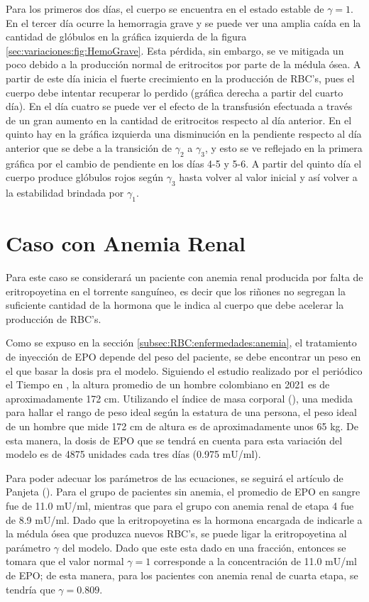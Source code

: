 Para los primeros dos días, el cuerpo se encuentra en el estado estable de $\gamma = 1$. En el tercer día ocurre la hemorragia grave y se puede ver una amplia caída en la cantidad de glóbulos en la gráfica izquierda de la figura \ref{sec:variaciones:fig:HemoGrave}. Esta pérdida, sin embargo, se ve mitigada un poco debido a la producción normal de eritrocitos por parte de la médula ósea. A partir de este día inicia el fuerte crecimiento en la producción de RBC's, pues el cuerpo debe intentar recuperar lo perdido (gráfica derecha a partir del cuarto día). En el día cuatro se puede ver el efecto de la transfusión efectuada a través de un gran aumento en la cantidad de eritrocitos respecto al día anterior. En el quinto hay en la gráfica izquierda una disminución en la pendiente respecto al día anterior que se debe a la transición de $\gamma_2$ a $\gamma_3$, y esto se ve reflejado en la primera gráfica por el cambio de pendiente en los días 4-5 y 5-6. A partir del quinto día el cuerpo produce glóbulos rojos según $\gamma_3$ hasta volver al valor inicial y así volver a la estabilidad brindada por $\gamma_1$.

\section{Caso con Anemia Renal}\label{Sec:variaciones:anemia}

Para este caso se considerará un paciente con anemia renal producida por falta de eritropoyetina en el torrente sanguíneo, es decir que los riñones no segregan la suficiente cantidad de la hormona que le indica al cuerpo que debe acelerar la producción de RBC's.

Como se expuso en la sección \ref{subsec:RBC:enfermedades:anemia}, el tratamiento de inyección de EPO depende del peso del paciente, se debe encontrar un peso en el que basar la dosis pra el modelo. Siguiendo el estudio realizado por el periódico el Tiempo en \cite{elTiempo}, la altura promedio de un hombre colombiano en 2021 es de aproximadamente 172 cm. Utilizando el índice de masa corporal (\cite{IMC}), una medida para hallar el rango de peso ideal según la estatura de una persona, el peso ideal de un hombre que mide 172 cm de altura es de aproximadamente unos 65 kg. De esta manera, la dosis de EPO que se tendrá en cuenta para esta variación del modelo es de 4875 unidades cada tres días (0.975 mU/ml).

Para poder adecuar los parámetros de las ecuaciones, se seguirá el artículo de Panjeta (\cite{panjeta2017interpretation}). Para el grupo de pacientes sin anemia, el promedio de EPO en sangre fue de 11.0 mU/ml, mientras que para el grupo con anemia renal de etapa 4 fue de 8.9 mU/ml. Dado que la eritropoyetina es la hormona encargada de indicarle a la médula ósea que produzca nuevos RBC's, se puede ligar la eritropoyetina al parámetro $\gamma$ del modelo. Dado que este esta dado en una fracción, entonces se tomara que el valor normal $\gamma = 1$ corresponde a la concentración de 11.0 mU/ml de EPO; de esta manera, para los pacientes con anemia renal de cuarta etapa, se tendría que $\gamma = 0.809$. 

